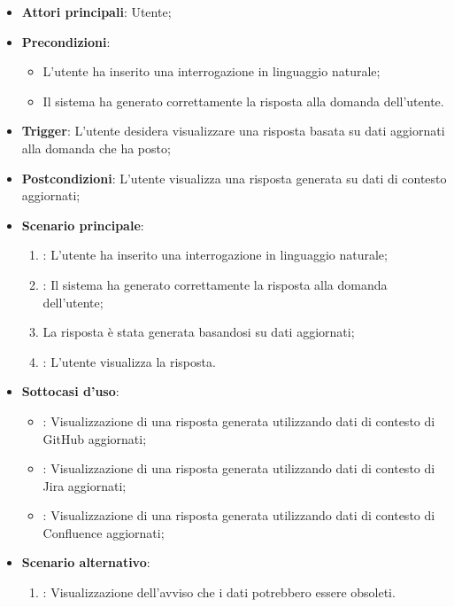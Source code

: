 \begin{itemize}
    \item \textbf{Attori principali}: Utente;
    \item \textbf{Precondizioni}: 
    \begin{itemize}
        \item L'utente ha inserito una interrogazione in linguaggio naturale;
        \item Il sistema ha generato correttamente la risposta alla domanda dell'utente.
    \end{itemize}
    \item \textbf{Trigger}: L'utente desidera visualizzare una risposta basata su dati aggiornati alla domanda che ha posto;
    \item \textbf{Postcondizioni}: L'utente visualizza una risposta generata su dati di contesto aggiornati;
    \item \textbf{Scenario principale}:
    \begin{enumerate}
        \item {}: L'utente ha inserito una interrogazione in linguaggio naturale;
        \item {}: Il sistema ha generato correttamente la risposta alla domanda dell'utente;
        \item La risposta è stata generata basandosi su dati aggiornati;
        \item {}: L'utente visualizza la risposta.
    \end{enumerate}
    \item \textbf{Sottocasi d'uso}:
    \begin{itemize}
        \item {}: Visualizzazione di una risposta generata utilizzando dati di contesto di 
        GitHub aggiornati;
        \item {}: Visualizzazione di una risposta generata utilizzando dati di contesto di 
        Jira aggiornati;
        \item {}: Visualizzazione di una risposta generata utilizzando dati di contesto di 
        Confluence aggiornati;
    \end{itemize}
    \item \textbf{Scenario alternativo}:
    \begin{enumerate}
        \item {}: Visualizzazione dell’avviso che i dati potrebbero essere obsoleti.
    \end{enumerate}
\end{itemize}



